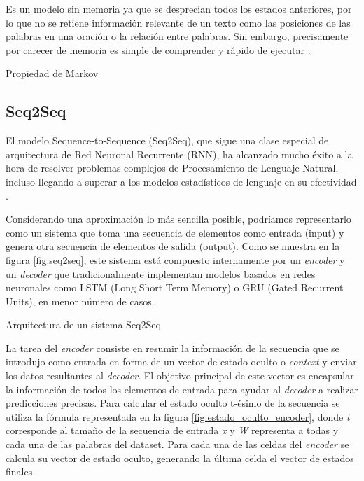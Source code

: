 Es un modelo sin memoria ya que se desprecian todos los estados anteriores, por lo que no se retiene información relevante de un texto como las posiciones de las palabras en una oración o la relación entre palabras. Sin embargo, precisamente por carecer de memoria es simple de comprender y rápido de ejecutar \citep{fumagalli_2020}.

%
{Propiedad de Markov}



\subsection{Seq2Seq}
El modelo Sequence-to-Sequence (Seq2Seq), que sigue una clase especial de arquitectura de Red Neuronal Recurrente (RNN), ha alcanzado mucho éxito a la hora de resolver problemas complejos de Procesamiento de Lenguaje Natural, incluso llegando a superar a los modelos estadísticos de lenguaje en su efectividad \citep{analytics_vidhya_2020}.

Considerando una aproximación lo más sencilla posible, podríamos representarlo como un sistema que toma una secuencia de elementos como entrada (input) y genera otra secuencia de elementos de salida (output). Como se muestra en la figura \ref{fig:seq2seq}, este sistema está compuesto internamente por un \textit{encoder} y un \textit{decoder} que tradicionalmente implementan modelos basados en redes neuronales como LSTM (Long Short Term Memory) o GRU (Gated Recurrent Units), en menor número de casos. 

%
{Arquitectura de un sistema Seq2Seq}

La tarea del \textit{encoder} consiste en resumir la información de la secuencia que se introdujo como entrada en forma de un vector de estado oculto o \textit{context} y enviar los datos resultantes al \textit{decoder}. El objetivo principal de este vector es encapsular la información de todos los elementos de entrada para ayudar al \textit{decoder} a realizar predicciones precisas. Para calcular el estado oculto t-ésimo de la secuencia se utiliza la fórmula representada en la figura \ref{fig:estado_oculto_encoder}, donde \textit{t} corresponde al tamaño de la secuencia de entrada \textit{x} y \textit{W} representa a todas y cada una de las palabras del dataset. Para cada una de las celdas del \textit{encoder} se calcula su vector de estado oculto, generando la última celda el vector de estados finales.

